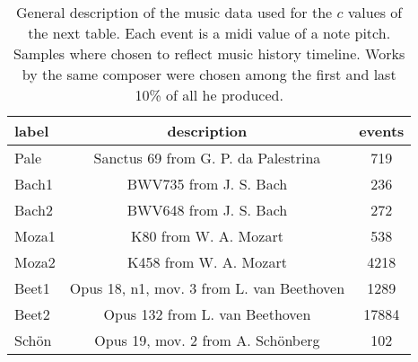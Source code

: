 \begin{table}[h!]
\begin{center}
\begin{tabular}{| l | c | c |}\hline
label & description & events \\\hline
Pale & Sanctus 69 from G. P. da Palestrina & 719 \\\hline
Bach1 & BWV735 from J. S. Bach & 236 \\\hline
Bach2 & BWV648 from J. S. Bach & 272 \\\hline
Moza1 & K80 from W. A. Mozart & 538 \\\hline
Moza2 & K458 from W. A. Mozart & 4218 \\\hline
Beet1 & Opus 18, n1, mov. 3 from L. van Beethoven & 1289 \\\hline
Beet2 & Opus 132 from L. van Beethoven & 17884 \\\hline
Sch\"on & Opus 19, mov. 2 from A. Sch\"onberg & 102 \\\hline
\end{tabular}
\caption{General description of the music data used for the $c$ values of the next table. Each event is a midi value of a note pitch. Samples where chosen to reflect music history timeline. Works by the same composer were chosen among the first and last 10\% of all he produced.}
\end{center}
\end{table}